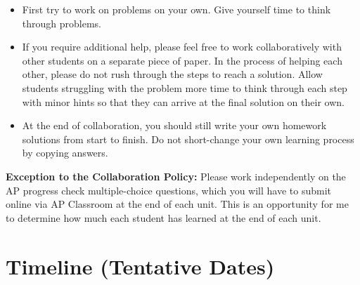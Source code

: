 \documentclass[12pt,fleqn]{article}
\providecommand{\tightlist}{%
  \setlength{\itemsep}{0pt}\setlength{\parskip}{0pt}}
\begin{document}
\begin{itemize}
\tightlist
\item
  First try to work on problems on your own. Give yourself time to think through problems.
\item
  If you require additional help, please feel free to work collaboratively with other students on a separate piece of paper. In the process of helping each other, please do not rush through the steps to reach a solution. Allow students struggling with the problem more time to think through each step with minor hints so that they can arrive at the final solution on their own.
\item
  At the end of collaboration, you should still write your own homework solutions from start to finish. Do not short-change your own learning process by copying answers.
\end{itemize}

\textbf{Exception to the Collaboration Policy:} Please work independently on the AP progress check multiple-choice questions, which you will have to submit online via AP Classroom at the end of each unit. This is an opportunity for me to determine how much each student has learned at the end of each unit.

\hypertarget{timeline-tentative-dates}{%
\section{Timeline (Tentative Dates)}\label{timeline-tentative-dates}}
\end{document}
